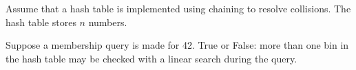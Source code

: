 \Needspace{3in}
\begin{prob}

    Assume that a hash table is implemented using chaining to resolve
    collisions. The hash table stores $n$ numbers.

    Suppose a membership query is made for 42. True or False: more than one bin
    in the hash table may be checked with a linear search during the query.

    \tF{}

\end{prob}
